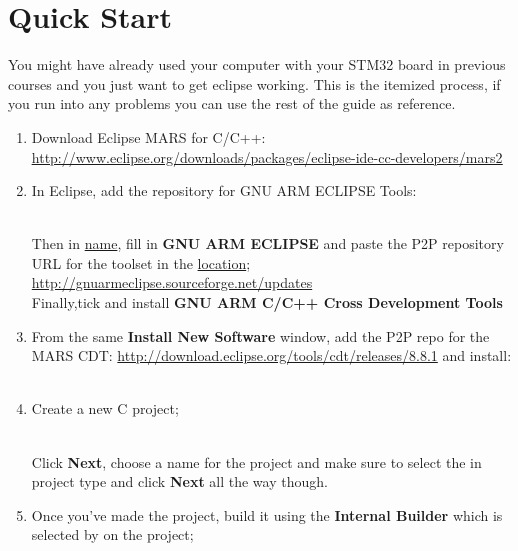\section{Quick Start}
\label{tldr}
You might have already used your computer with your STM32 board in previous courses and you just want to get eclipse working. This is the itemized process, if you run into any problems you can use the rest of the guide as reference.
\par
\begin{enumerate}
\raggedright
\item Download Eclipse MARS for C/C++:\\
\centering \href{http://www.eclipse.org/downloads/packages/eclipse-ide-cc-developers/mars2}{\color{Blue} \underline{http://www.eclipse.org/downloads/packages/eclipse-ide-cc-developers/mars2}}
\\
\raggedright
\item In Eclipse, add the repository for GNU ARM ECLIPSE Tools:\\
\centering {}
\\
\raggedright
Then in \underline{name}, fill in \textbf{GNU ARM ECLIPSE} and paste the P2P repository URL for the toolset in the \underline{location}; \url{http://gnuarmeclipse.sourceforge.net/updates} 
\\
Finally,tick and install \textbf{GNU ARM C/C++ Cross Development Tools}
\raggedright
\item From the same \textbf{Install New Software} window, add the P2P repo for the MARS CDT: \url{http://download.eclipse.org/tools/cdt/releases/8.8.1} and install:
\\
\centering {}
\\
\raggedright
\item Create a new C project;\\
\centering {}\\
\raggedright 
Click \textbf{Next}, choose a name for the project and make sure to select the  in project type and click \textbf{Next} all the way though.
\raggedright
\item Once you've made the project, build it using the \textbf{Internal Builder} which is selected by  on the project;\\
\centering {}

\end{enumerate}
